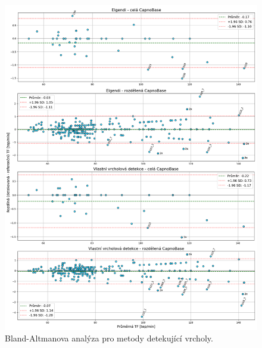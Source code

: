 \begin{figure}[!ht]
	\centering
	\includegraphics[width=1\textwidth]{./obrazky/vysledky/BlandAltman_CB_peaks.png}
	\caption[Bland-Altmanova analýza pro metody detekující vrcholy]{Bland-Altmanova analýza pro metody detekující vrcholy.}
	\label{fig:capnobase_BlandAltman_peaks}
\end{figure}

